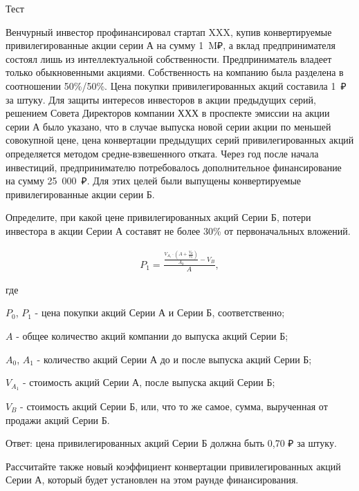 \documentclass[12pt, table]{exam}
\begin{document}
\setcounter{section}{0\relax}%
\noindent
\normalsize

\begin{questions}
\question[40] Тест
\answerstotest

	
\question[20]
Венчурный инвестор профинансировал стартап XXX, купив конвертируемые привилегированные акции серии А на сумму 1~M₽, а вклад предпринимателя состоял лишь из интеллектуальной собственности. Предприниматель владеет только обыкновенными акциями. Собственность на компанию была разделена в соотношении 50\%/50\%. Цена покупки привилегированных акций составила 1~₽ за штуку.
Для защиты интересов инвесторов в акции предыдущих серий, решением Совета Директоров компании ХХХ в проспекте эмиссии на акции серии А было указано, что в случае выпуска новой серии акции по меньшей совокупной цене, цена конвертации предыдущих серий привилегированных акций определяется методом средне-взвешенного отката.
Через год после начала инвестиций, предпринимателю потребовалось дополнительное финансирование на сумму  25~000~₽.
Для этих целей были выпущены конвертируемые привилегированные акции серии Б.
\noaddpoints
\pagebreak
\begin{subparts}
\subpart[10] Определите, при какой цене привилегированных акций Серии Б, потери инвестора в акции Серии А составят не более 30\% от первоначальных вложений.
\begin{solution}[18em]
\begin{align}
P_1=\frac{\frac{V_{A_1} \cdot (A + \frac{V_B}{P_0})}{A_0}-V_B}{A},
\end{align}

где

$P_0$, $P_1$ - цена покупки акций Серии А и Серии Б, соответственно;

$A$ - общее количество акций компании до выпуска акций Серии Б;

$A_0$, $A_1$ - количество акций Серии А до и после выпуска акций Серии Б;

$V_{A_1}$ - стоимость акций Серии А, после выпуска акций Серии Б;

$V_B$ - стоимость акций Серии Б, или, что то же самое, сумма, вырученная от продажи акций Серии Б.

Ответ: цена привилегированных акций Серии Б должна быть 0,70 ₽ за штуку.					
\end{solution}

\subpart[5] Рассчитайте также новый коэффициент конвертации привилегированных акций Серии А, который будет установлен на этом раунде финансирования.


\end{subparts}
\end{questions}
\end{document}
